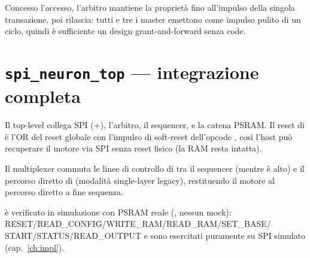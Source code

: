 Concesso l'accesso, l'arbitro mantiene la proprietà fino all'impulso 
della singola transazione, poi rilascia: tutti e tre i master emettono  come
impulso pulito di un ciclo, quindi è sufficiente un design grant-and-forward senza code.

\section{\texttt{spi\_neuron\_top} --- integrazione completa}
Il top-level collega SPI (+), l'arbitro, il sequencer,
 e la catena PSRAM. Il reset di  è l'OR del
reset globale con l'impulso di soft-reset dell'opcode , così l'host può
recuperare il motore via SPI senza reset fisico (la RAM resta intatta).

\begin{center}
\end{center}

Il multiplexer commuta le linee di controllo di  tra il sequencer
(mentre  è alto) e il percorso diretto di  (modalità
single-layer legacy), restituendo il motore al percorso diretto a fine sequenza.

\begin{fnnote}
 è verificato in simulazione con PSRAM reale
(, nessun mock): RESET/READ\_CONFIG/WRITE\_RAM/READ\_RAM/SET\_BASE/
START/STATUS/READ\_OUTPUT e  sono esercitati puramente su SPI simulato
(cap.~\ref{ch:impl}).
\end{fnnote}
